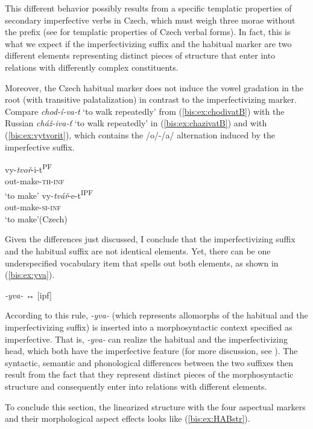 \documentclass[output=paper]{langscibook}
\begin{document}
\noindent This different behavior possibly results from a specific templatic properties of secondary imperfective verbs in Czech, which must weigh three morae without the prefix (see \citealt{Scheer2003,Caha.Scheer2008,Caha.Zikova2016} for templatic properties of Czech verbal forms). In fact, this is what we expect if the imperfectivizing suffix and the habitual marker are two different elements representing distinct pieces of structure that enter into relations with differently complex constituents.

Moreover, the Czech habitual marker does not induce the vowel gradation in the root (with transitive palatalization) in contrast to the imperfectivizing marker. Compare \textit{chod-í-va-t} ‘to walk repeatedly’ from (\ref{bis:ex:chodivatB}) with the Russian \textit{cháž-iva-ť} ‘to walk repeatedly’ in (\ref{bis:ex:chazivatB}) and with (\ref{bis:ex:vytvorit}), which contains the /o/-/a/ alternation induced by the imperfective suffix.

\ea\label{bis:ex:vytvorit}
\ea\label{bis:ex:vytvoritA} \gll 
vy-\textit{tvoř}-i-t\textsuperscript{PF} \\ 
out-make-\textsc{th}-\textsc{inf} \\
\glt ‘to make’
\ex\label{bis:ex:vytvaretB} \gll vy-\textit{tvář}-e-t\textsuperscript{IPF} \\
out-make-\textsc{si}-\textsc{inf} \\
\glt ‘to make’\hfill (Czech)
\z
\z

\noindent Given the differences just discussed, I conclude that the imperfectivizing suffix and the habitual suffix are not identical elements. Yet, there can be one underspecified vocabulary item that spells out both elements, as shown in (\ref{bis:ex:yva}). 

\ea\label{bis:ex:yva}	
\textit{-yva-} ↔ [ipf]
\z

\noindent According to this rule, \textit{-yva-} (which represents allomorphs of the habitual and the imperfectivizing suffix) is inserted into a morphosyntactic context specified as imperfective. That is, \textit{-yva-} can realize the habitual and the imperfectivizing head, which both have the imperfective feature (for more discussion, see ). The syntactic, semantic and phonological differences between the two suffixes then result from the fact that they represent distinct pieces of the morphosyntactic structure and consequently enter into relations with different elements.

To conclude this section, the linearized structure with the four aspectual markers and their morphological aspect effects looks like (\ref{bis:ex:HABstr}). 
\end{document}
